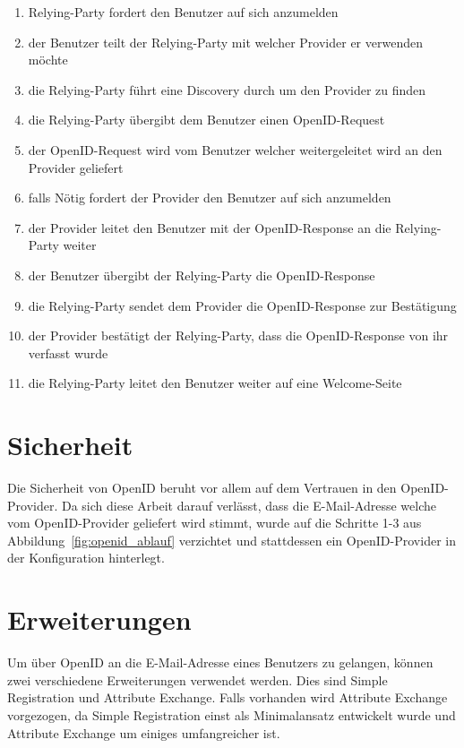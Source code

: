 \begin{enumerate}
  \item Relying-Party fordert den Benutzer auf sich anzumelden
  \item der Benutzer teilt der Relying-Party mit welcher Provider er verwenden möchte
  \item die Relying-Party führt eine Discovery durch um den Provider zu finden
  \item die Relying-Party übergibt dem Benutzer einen OpenID-Request
  \item der OpenID-Request wird vom Benutzer welcher weitergeleitet wird an den Provider geliefert
  \item falls Nötig fordert der Provider den Benutzer auf sich anzumelden
  \item der Provider leitet den Benutzer mit der OpenID-Response an die Relying-Party weiter
  \item der Benutzer übergibt der Relying-Party die OpenID-Response
  \item die Relying-Party sendet dem Provider die OpenID-Response zur Bestätigung
  \item der Provider bestätigt der Relying-Party, dass die OpenID-Response von ihr verfasst wurde
  \item die Relying-Party leitet den Benutzer weiter auf eine Welcome-Seite
\end{enumerate}

\section{Sicherheit}
\label{sec:sicherheit}
Die Sicherheit von OpenID beruht vor allem auf dem Vertrauen in den OpenID-Provider. Da sich diese Arbeit darauf verlässt, dass die E-Mail-Adresse welche vom OpenID-Provider geliefert wird stimmt, wurde auf die Schritte 1-3 aus Abbildung~\ref{fig:openid_ablauf} verzichtet und stattdessen ein OpenID-Provider in der Konfiguration hinterlegt.

\section{Erweiterungen}
\label{sec:erweiterungen}
Um über OpenID an die E-Mail-Adresse eines Benutzers zu gelangen, können zwei verschiedene Erweiterungen verwendet werden. Dies sind Simple Registration\cite{openid/sreg1.0} und Attribute Exchange\cite{openid/ax1.0}. Falls vorhanden wird Attribute Exchange vorgezogen, da Simple Registration einst als Minimalansatz entwickelt wurde und Attribute Exchange um einiges umfangreicher ist. 